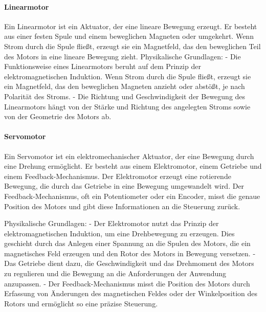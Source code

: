 \paragraph{Linearmotor}
Ein Linearmotor ist ein Aktuator, der eine lineare Bewegung erzeugt. Er besteht aus einer festen Spule und einem
beweglichen Magneten oder umgekehrt. Wenn Strom durch
die Spule fließt, erzeugt sie ein Magnetfeld, das den beweglichen Teil des Motors in eine lineare Bewegung zieht. \newline
Physikalische Grundlagen:\newline
- Die Funktionsweise eines Linearmotors beruht auf dem Prinzip der elektromagnetischen Induktion. Wenn Strom durch die
Spule fließt, erzeugt sie ein Magnetfeld, das den beweglichen Magneten anzieht oder abstößt, je nach Polarität des Stroms. \newline
- Die Richtung und Geschwindigkeit der Bewegung des Linearmotors hängt von der Stärke und Richtung des angelegten Stroms
sowie von der Geometrie des Motors ab.

\paragraph{Servomotor}
Ein Servomotor ist ein elektromechanischer Aktuator, der eine Bewegung durch eine Drehung ermöglicht.
Er besteht aus einem Elektromotor, einem Getriebe und einem Feedback-Mechanismus. Der Elektromotor erzeugt eine rotierende
Bewegung, die durch das Getriebe in eine Bewegung umgewandelt wird. Der
Feedback-Mechanismus, oft ein Potentiometer oder ein Encoder, misst die genaue Position des Motors und gibt diese
Informationen an die Steuerung zurück.\newline

Physikalische Grundlagen: \newline
- Der Elektromotor nutzt das Prinzip der elektromagnetischen Induktion, um eine Drehbewegung zu erzeugen. Dies geschieht
durch das Anlegen einer Spannung an die Spulen des Motors, die ein magnetisches Feld erzeugen und den Rotor des Motors in
Bewegung versetzen. \newline
- Das Getriebe dient dazu, die Geschwindigkeit und das Drehmoment des Motors zu regulieren und die Bewegung an die
Anforderungen der Anwendung anzupassen. \newline
- Der Feedback-Mechanismus misst die Position des Motors durch Erfassung von Änderungen des magnetischen Feldes oder der
Winkelposition des Rotors und ermöglicht so eine präzise Steuerung.

